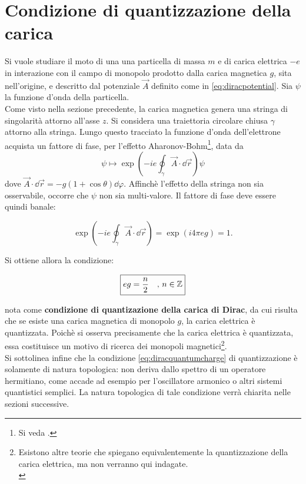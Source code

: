 
\section{Condizione di quantizzazione della carica}
Si vuole studiare il moto di una una particella di massa $m$ e di carica elettrica
$-e$ in interazione con il campo di monopolo prodotto dalla carica magnetica $g$,
sita nell'origine, e descritto dal potenziale $\vec A$ definito come in
\ref{eq:diracpotential}.
Sia $\psi$ la funzione d'onda della particella. \\
Come visto nella sezione precedente, la carica magnetica genera una stringa di singolarità
attorno all'asse $z$. Si considera una traiettoria circolare chiusa $\gamma$
attorno alla stringa. Lungo questo tracciato la funzione d'onda dell'elettrone
acquista un fattore di fase, per l'effetto Aharonov-Bohm\footnote{Si veda \cite{sakurai}.},
data da
$$
   \psi \mapsto \exp \left(-ie \oint_\gamma \vec A \cdot \dd \vec r \right) \psi
$$
dove $\vec A \cdot \dd \vec r = -g(1+\cos\theta) \dd \varphi$.
Affinchè l'effetto della stringa non sia osservabile, occorre che $\psi$ non
sia multi-valore. Il fattore di fase deve essere quindi banale:

$$
   \exp \left(-ie \oint_\gamma \vec A \cdot \dd \vec r \right)
      = \exp(i4 \pi eg) = 1.
$$

Si ottiene allora la condizione:

\begin{equation}\label{eq:diracquantumcharge}
   \boxed{
      eg = \frac{n}{2} \quad, \,  n \in \mathbb{Z}
   }
\end{equation}

nota come \textbf{condizione di quantizazione della carica
di Dirac}, da cui risulta che se esiste una carica magnetica di monopolo $g$,
la carica elettrica è quantizzata. Poichè si osserva precisamente che la carica elettrica è
quantizzata, essa costituisce un motivo di ricerca dei monopoli
magnetici\footnote{
   Esistono altre teorie che spiegano equivalentemente la quantizzazione della carica
   elettrica, ma non verranno qui indagate.\\
}.\\

Si sottolinea infine che la condizione \ref{eq:diracquantumcharge} di quantizzazione
è solamente di natura topologica: non deriva dallo spettro di un operatore hermitiano,
come accade ad esempio per l'oscillatore armonico o altri sistemi quantistici semplici.
La natura topologica di tale condizione verrà chiarita nelle sezioni successive.

